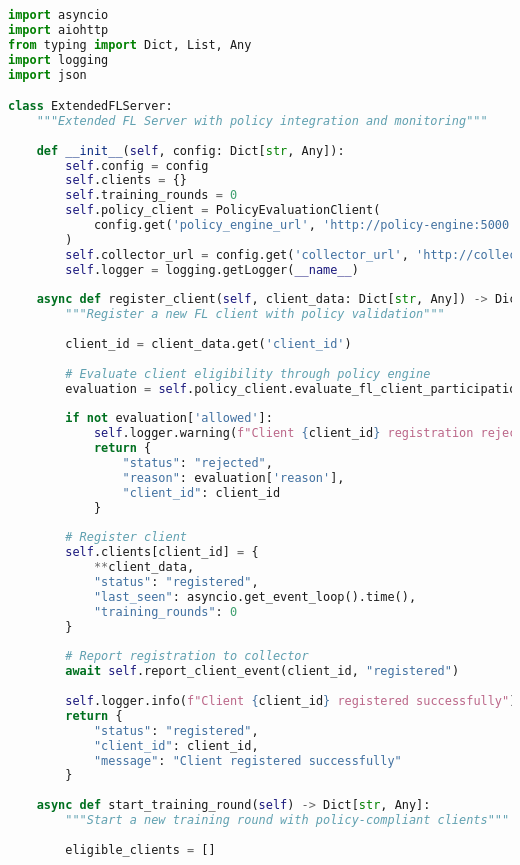 \begin{lstlisting}[language=python, caption=Extended FL Server Implementation]
import asyncio
import aiohttp
from typing import Dict, List, Any
import logging
import json

class ExtendedFLServer:
    """Extended FL Server with policy integration and monitoring"""
    
    def __init__(self, config: Dict[str, Any]):
        self.config = config
        self.clients = {}
        self.training_rounds = 0
        self.policy_client = PolicyEvaluationClient(
            config.get('policy_engine_url', 'http://policy-engine:5000')
        )
        self.collector_url = config.get('collector_url', 'http://collector:8000')
        self.logger = logging.getLogger(__name__)
    
    async def register_client(self, client_data: Dict[str, Any]) -> Dict[str, Any]:
        """Register a new FL client with policy validation"""
        
        client_id = client_data.get('client_id')
        
        # Evaluate client eligibility through policy engine
        evaluation = self.policy_client.evaluate_fl_client_participation(client_data)
        
        if not evaluation['allowed']:
            self.logger.warning(f"Client {client_id} registration rejected: {evaluation['reason']}")
            return {
                "status": "rejected",
                "reason": evaluation['reason'],
                "client_id": client_id
            }
        
        # Register client
        self.clients[client_id] = {
            **client_data,
            "status": "registered",
            "last_seen": asyncio.get_event_loop().time(),
            "training_rounds": 0
        }
        
        # Report registration to collector
        await self.report_client_event(client_id, "registered")
        
        self.logger.info(f"Client {client_id} registered successfully")
        return {
            "status": "registered",
            "client_id": client_id,
            "message": "Client registered successfully"
        }
    
    async def start_training_round(self) -> Dict[str, Any]:
        """Start a new training round with policy-compliant clients"""
        
        eligible_clients = []
        

\end{lstlisting}
